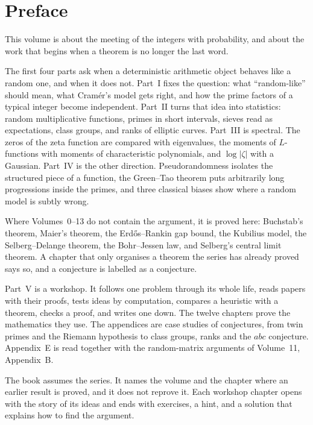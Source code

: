 \chapter*{Preface}
This volume is about the meeting of the integers with probability, and about the work that begins when a theorem is no longer the last word.

The first four parts ask when a deterministic arithmetic object behaves like a random one, and when it does not. Part~I fixes the question: what ``random-like'' should mean, what Cram\'er's model gets right, and how the prime factors of a typical integer become independent. Part~II turns that idea into statistics: random multiplicative functions, primes in short intervals, sieves read as expectations, class groups, and ranks of elliptic curves. Part~III is spectral. The zeros of the zeta function are compared with eigenvalues, the moments of $L$-functions with moments of characteristic polynomials, and $\log|\zeta|$ with a Gaussian. Part~IV is the other direction. Pseudorandomness isolates the structured piece of a function, the Green--Tao theorem puts arbitrarily long progressions inside the primes, and three classical biases show where a random model is subtly wrong.

Where Volumes~0--13 do not contain the argument, it is proved here: Buchstab's theorem, Maier's theorem, the Erd\H{o}s--Rankin gap bound, the Kubilius model, the Selberg--Delange theorem, the Bohr--Jessen law, and Selberg's central limit theorem. A chapter that only organises a theorem the series has already proved says so, and a conjecture is labelled as a conjecture.

Part~V is a workshop. It follows one problem through its whole life, reads papers with their proofs, tests ideas by computation, compares a heuristic with a theorem, checks a proof, and writes one down. The twelve chapters prove the mathematics they use. The appendices are case studies of conjectures, from twin primes and the Riemann hypothesis to class groups, ranks and the $abc$ conjecture. Appendix~E is read together with the random-matrix arguments of Volume~11, Appendix~B.

The book assumes the series. It names the volume and the chapter where an earlier result is proved, and it does not reprove it. Each workshop chapter opens with the story of its ideas and ends with exercises, a hint, and a solution that explains how to find the argument.
